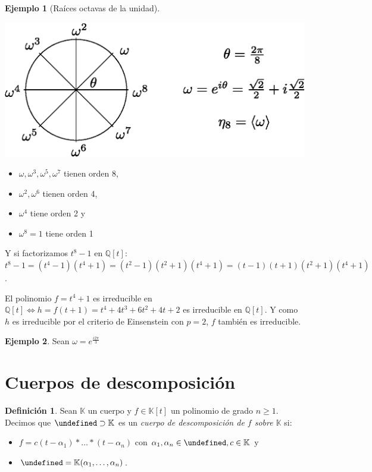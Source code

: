 \documentclass[10pt, spanish]{report}
\theoremstyle{definition}
\newtheorem*{defin}{Definición}
\newtheorem*{ej}{Ejemplo}
\newcommand{\Q}{\mathbb{Q}}
\newcommand{\K}{\mathbb{K}}
\let\L\undefined
\newcommand{\L}{\mathbb{L}}
\renewcommand{\geq}{\geqslant}
\newcommand{\fecha}[1]{\marginpar{\underline{#1}}}
\newcommand{\completar}{\fbox{\textbf{¡Completar!}}}
\begin{document}
\fecha{3/03}
\begin{ej}[Raíces octavas de la unidad]\hspace{2em}\vspace{1em}
    \begin{multicols}{2}

        \includegraphics[scale=0.6]{fig01.eps}
    \begin{itemize}
        \item $\omega,\omega^3,\omega^5,\omega^7$  tienen orden 8,
        \item $\omega^2,\omega^6$ tienen orden 4,
        \item $\omega^4$ tiene orden 2 y
        \item $\omega^8=1$ tiene orden 1
    \end{itemize}


    \end{multicols}

    Y si factorizamos $t^8-1$ en $\Q[t]$:
    $t^8-1=(t^4-1)(t^4+1)=(t^2-1)(t^2+1)(t^4+1)=(t-1)(t+1)(t^2+1)(t^4+1)$.

    El polinomio $f=t^4+1$ es irreducible en $\Q[t] \Leftrightarrow
    h=f(t+1)=t^4+4t^3+6t^2+4t+2$  es irreducible en $\Q[t]$. Y como $h$ es
    irreducible por el criterio de Einsenstein con $p=2$, $f$ también es
    irreducible.
\end{ej}

\begin{ej}
    \completar %
    Sean $\omega=e^{\frac{i2\pi}{3}}$
\end{ej}

\section{Cuerpos de descomposición}

\begin{defin}
    Sean $\K$ un cuerpo y $f\in\K[t]$ un polinomio de grado $n\geq1$. Decimos
    que $\L\supset\K$ es un \textit{cuerpo de descomposición de $f$ sobre $\K$}
    si:
    \begin{itemize}
        \item $f=c(t-\alpha_1)*\ldots*(t-\alpha_n)$ con $\alpha_1,\alpha_n\in\L, c\in \K$
            y
        \item $\L=\K(\alpha_1,\ldots,\alpha_n)$.
    \end{itemize}
\end{defin}
\end{document}
